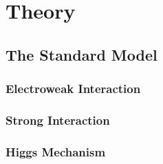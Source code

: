 \chapter{Theory}\label{ch:theory}

\section{The Standard Model}\label{sec:sm}

\subsection{Electroweak Interaction}\label{subsec:ew_inter}
\subsection{Strong Interaction}\label{subsec:strong_inter}
\subsection{Higgs Mechanism}\label{subsec:higgs_mech}